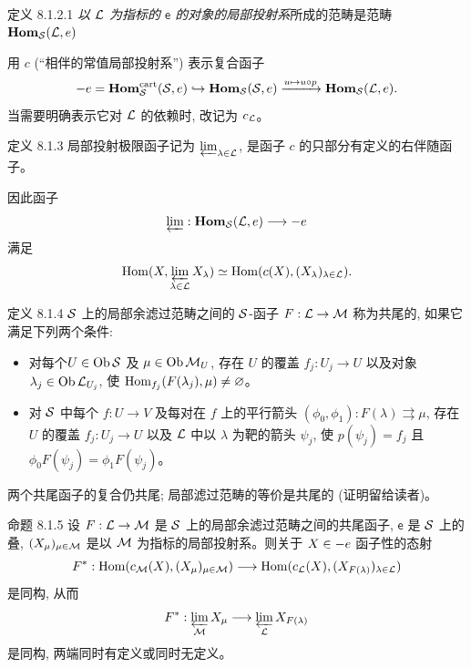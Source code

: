 \begin{enonce*}{定义 8.1.2.1}
\emph{以 ${\mathcal L}$ 为指标的 $\mathsf{e}$ 的对象的局部投射系}所成的范畴是范畴
$\operatorname{\mathbf{Hom}}_{{\mathcal S}}({\mathcal L},{e})$
\end{enonce*}

用 $c$ (“相伴的常值局部投射系”) 表示复合函子
$$
\protect\mathcal{\Gamma}{e}=\operatorname{\mathbf{Hom}}^{\operatorname{cart}}_{{\mathcal S}}({\mathcal S},{e})
\hookrightarrow\operatorname{\mathbf{Hom}}_{{\mathcal S}}({\mathcal S},{e})
\xrightarrow{u\mapsto u\circ p}\operatorname{\mathbf{Hom}}_{{\mathcal S}}({\mathcal L},{e}).
$$
当需要明确表示它对 ${\mathcal L}$ 的依赖时, 改记为 $c_{{\mathcal L}}$。

\begin{enonce*}{定义 8.1.3}
局部投射极限函子记为 $\varprojlim_{\lambda\in{\mathcal L}}$, 是函子 $c$ 的只部分有定义的右伴随函子。
\end{enonce*}

因此函子
$$
\varprojlim:\Hhom_{\Ss}(\Ll,\mathsf{e})\to
\sheaf{\Gamma}\mathsf{e}
$$
满足
$$
\operatorname{Hom}(X,\varprojlim_{\lambda\in{\mathcal L}}X_\lambda)\simeq
\operatorname{Hom}(c(X),(X_\lambda)_{\lambda\in{\mathcal L}}){}.
$$

\begin{enonce*}{定义 8.1.4}
${\mathcal S}$ 上的局部余滤过范畴之间的 ${\mathcal S}$-函子 $F:\Ll\to\Mm$ 称为共尾的, 如果它满足下列两个条件:
\begin{itemize}
\item[$(C\mathfrak{F}1)$] 对每个\pageoriginale $U\in\operatorname{Ob}{\mathcal S}$ 及 $\mu\in\operatorname{Ob}{\mathcal M}_U$, 存在 $U$ 的覆盖 $f_j:U_j\to U$ 以及对象 $\lambda_j\in\operatorname{Ob}{\mathcal L}_{U_j}$, 使 $\operatorname{Hom}_{f_j}(F(\lambda_j),\mu)\neq\varnothing$。

\item[$(C\mathfrak{F}2)$] 对 ${\mathcal S}$ 中每个 $f:U\to V$ 及每对在 $f$ 上的平行箭头 $(\phi_0,\phi_1):F(\lambda)
\rightrightarrows\mu$, 存在 $U$ 的覆盖 $f_j:U_j\to U$ 以及 ${\mathcal L}$ 中以 $\lambda$ 为靶的箭头 $\psi_j$, 使 $p(\psi_j)=f_j$ 且 $\phi_0F(\psi_j)=\phi_1F(\psi_j)$。
\end{itemize}
\end{enonce*}

两个共尾函子的复合仍共尾; 局部滤过范畴的等价是共尾的 (证明留给读者)。

\begin{enonce*}{命题 8.1.5}
设 $F:\Ll\to\Mm$ 是 ${\mathcal S}$ 上的局部余滤过范畴之间的共尾函子, $\mathsf{e}$ 是 ${\mathcal S}$ 上的叠, $(X_\mu)_{\mu\in{\mathcal M}}$ 是以 ${\mathcal M}$ 为指标的局部投射系。则关于 $X\in\protect\mathcal{\Gamma}{e}$ 函子性的态射
\[
F^{\ast}:\operatorname{Hom}(c_{{\mathcal M}}(X),(X_\mu)_{\mu\in{\mathcal M}})\longrightarrow
\operatorname{Hom}(c_{{\mathcal L}}(X),(X_{F(\lambda)})_{\lambda\in{\mathcal L}})
\]
是同构, 从而
$$
F^{\ast}:\varprojlim_{{\mathcal M}}X_\mu\longrightarrow
\varprojlim_{{\mathcal L}}X_{F(\lambda)}
$$
是同构, 两端同时有定义或同时无定义。
\end{enonce*}

